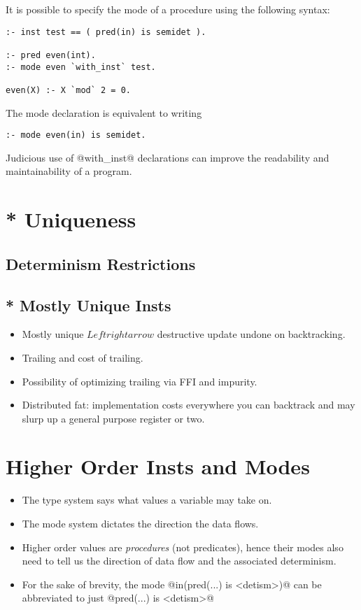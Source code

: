 It is possible to specify the mode of a procedure using the
following syntax:
\begin{verbatim}
:- inst test == ( pred(in) is semidet ).

:- pred even(int).
:- mode even `with_inst` test.

even(X) :- X `mod` 2 = 0.
\end{verbatim}
The mode declaration is equivalent to writing
\begin{verbatim}
:- mode even(in) is semidet.
\end{verbatim}


Judicious use of @with_inst@ declarations can improve the
readability and maintainability of a program.

\section{* Uniqueness}
\subsection{Determinism Restrictions}


\subsection{* Mostly Unique Insts}

\begin{itemize}
\item Mostly unique $Leftrightarrow$ destructive update undone on
  backtracking.
\item Trailing and cost of trailing.
\item Possibility of optimizing trailing via FFI and impurity.
\item Distributed fat: implementation costs everywhere you can
  backtrack and may slurp up a general purpose register or
  two.
\end{itemize}

\section{Higher Order Insts and Modes}

\begin{itemize}
\item The type system says what values a variable may take on.
\item The mode system dictates the direction the data flows.
\item Higher order values are \emph{procedures} (not predicates), hence
  their modes also need to tell us the direction of data flow
  and the associated determinism.  
\item For the sake of brevity, the mode @in(pred(...) is <detism>)@
  can be abbreviated to just @pred(...) is <detism>@
\end{itemize}

